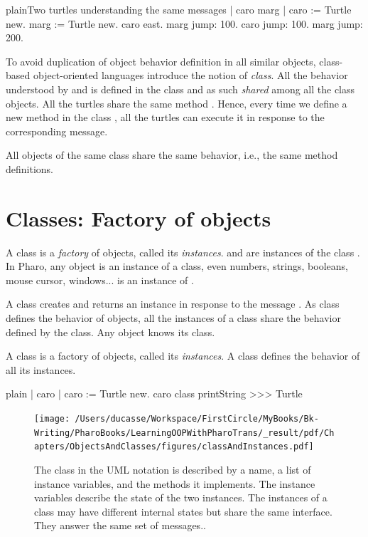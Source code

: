 \documentclass[10pt,twoside,english]{_support/latex/sbabook/sbabook}
\begin{document}
\begin{listing}[float]{plain}{Two turtles understanding the same messages}
| caro marg | 
caro := Turtle new.
marg := Turtle new.
caro east. 
marg jump: 100.
caro jump: 100.
marg jump: 200. 
\end{listing}

To avoid duplication of object behavior definition in all similar objects, class-based object-oriented languages introduce the notion of \textit{class}. All the behavior understood by  and  is defined in the class  and as such \textit{shared} among all the class objects.  All the turtles share the same method . Hence, every time we define a new method in the class , all the turtles can execute it in response to the corresponding message.

\begin{important}
All objects of the same class share the same behavior, i.e., the same method definitions.
\end{important}
\section{Classes: Factory of objects}
A class is a \textit{factory} of objects, called its \textit{instances}.  and  are instances of the class .
In Pharo, any object is an instance of a class, even numbers, strings, booleans, mouse cursor, windows...
 is an instance of .  

A class creates and returns an instance in response to the message . As class defines the behavior of objects, all the instances of a class share the behavior defined by the class. Any object knows its class. 

\begin{important}
A class is a factory of objects, called its \textit{instances}. A class defines the behavior of all its instances.
\end{important}

\begin{displaycode}{plain}
| caro |
caro := Turtle new. 
caro class printString
>>> Turtle
\end{displaycode}


\begin{figure}

\begin{center}
\texttt{[image: /Users/ducasse/Workspace/FirstCircle/MyBooks/Bk-Writing/PharoBooks/LearningOOPWithPharoTrans/\_result/pdf/Chapters/ObjectsAndClasses/figures/classAndInstances.pdf]}\caption{The class  in the UML notation is described by a name, a list of instance variables, and the methods it implements. The instance variables describe the state of the two instances. The instances of a class may have different internal states but share the same interface. They answer the same set of messages..\label{fig:classAndInstances}}\end{center}
\end{figure}
\end{document}
